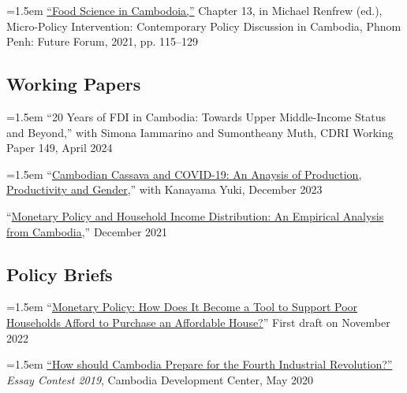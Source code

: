 \documentclass[10pt,a4paper]{article}
\begin{document}
\hangindent=1.5em
\href{https://kosalnith.github.io/research/policies/PolicyBrief-FST.pdf}{``Food Science in Cambodoia,''} Chapter 13, in Michael Renfrew (ed.), Micro-Policy Intervention: Contemporary Policy Discussion in Cambodia, Phnom Penh: Future Forum, 2021, pp. 115–129 

\subsection*{Working Papers}

		\hangindent=1.5em
	``20 Years of FDI in Cambodia: Towards Upper Middle-Income Status and Beyond,'' with Simona Iammarino and Sumontheany Muth, CDRI Working Paper 149, April 2024 \\ \vspace{-.5em}
	
	\hangindent=1.5em
	“\href{}{Cambodian Cassava and COVID-19: An Anaysis of Production, Productivity and Gender},” with Kanayama Yuki, December 2023\\ \vspace{-.5em}
	
	“\href{https://kosalnith.github.io/research/papers/MPHI.pdf}{Monetary Policy and Household Income Distribution: An Empirical Analysis from Cambodia},” December 2021 

\subsection*{Policy Briefs}
	
		\hangindent=1.5em
		“\href{}{Monetary Policy: How Does It Become a Tool to Support Poor Households Afford to Purchase an Affordable House?}” First draft on November 2022 \\ \vspace{-.5em}
	
		\hangindent=1.5em
		\href{https://cd-center.org/en/essay-contest-2019-first-place-winner/}{``How should Cambodia Prepare for the Fourth Industrial Revolution?''} \textit{Essay Contest 2019}, Cambodia Development Center, May 2020
\end{document}
